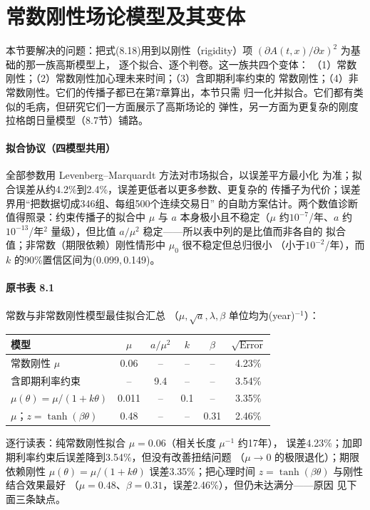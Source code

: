 \section{常数刚性场论模型及其变体}

本节要解决的问题：把式(8.18)用到以刚性（rigidity）项
$(\partial A(t,x)/\partial x)^{2}$ 为基础的那一族高斯模型上，
逐个拟合、逐个判卷。这一族共四个变体：
（1）常数刚性；（2）常数刚性加心理未来时间；（3）含即期利率约束的
常数刚性；（4）非常数刚性。它们的传播子都已在第7章算出，本节只需
归一化并拟合。它们都有类似的毛病，但研究它们一方面展示了高斯场论的
弹性，另一方面为更复杂的刚度拉格朗日量模型（8.7节）铺路。

\paragraph{拟合协议（四模型共用）}
全部参数用 Levenberg--Marquardt 方法对市场拟合，以误差平方最小化
为准；拟合误差从约4.2\%到2.4\%，误差更低者以更多参数、更复杂的
传播子为代价；误差界用“把数据切成346组、每组500个连续交易日”
的自助方案估计。两个数值诊断值得照录：约束传播子的拟合中 $\mu$ 与
$a$ 本身极小且不稳定（$\mu$ 约$10^{-7}$/年、$a$ 约$10^{-13}$/年$^{2}$
量级），但比值 $a/\mu^{2}$ 稳定——所以表中列的是比值而非各自的
拟合值；非常数（期限依赖）刚性情形中 $\mu_{0}$ 很不稳定但总归很小
（小于$10^{-2}$/年），而 $k$ 的90\%置信区间为(0.099,\,0.149)。

\paragraph{原书表 8.1}\quad 常数与非常数刚性模型最佳拟合汇总
（$\mu,\sqrt{a},\lambda,\beta$ 单位均为(year)$^{-1}$）：
\begin{center}
\begin{tabular}{lccccc}
\hline\hline
模型 & $\mu$ & $a/\mu^{2}$ & $k$ & $\beta$ & $\sqrt{\text{Error}}$\\
\hline
常数刚性 $\mu$ & 0.06 & -- & -- & -- & 4.23\%\\
含即期利率约束 & -- & 9.4 & -- & -- & 3.54\%\\
$\mu(\theta)=\mu/(1+k\theta)$ & 0.011 & -- & 0.1 & -- & 3.35\%\\
$\mu$；$z=\tanh(\beta\theta)$ & 0.48 & -- & -- & 0.31 & 2.46\%\\
\hline
\end{tabular}
\end{center}
逐行读表：纯常数刚性拟合 $\mu=0.06$（相关长度 $\mu^{-1}$ 约17年），
误差4.23\%；加即期利率约束后误差降到3.54\%，但没有改善扭结问题
（$\mu\to0$ 的极限退化）；期限依赖刚性 $\mu(\theta)=\mu/(1+k\theta)$
误差3.35\%；把心理时间 $z=\tanh(\beta\theta)$ 与刚性结合效果最好
（$\mu=0.48$、$\beta=0.31$，误差2.46\%），但仍未达满分——原因
见下面三条缺点。


